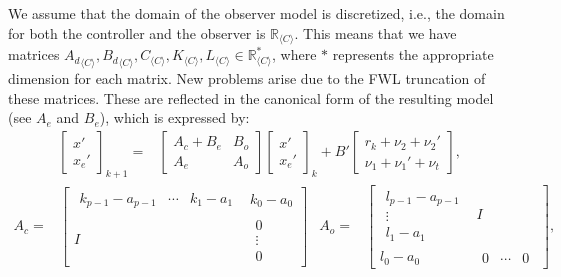 \documentclass[sigconf]{llncs}
\newcommand{\mat}[1]{{#1}}
\renewcommand{\vec}[1]{{#1}}
\begin{document}
We assume that the domain of the observer model is discretized, 
i.e., the domain for both the controller and the observer is $\mathbb{R}_{\langle C \rangle}$.
This means that we have matrices 
${\mat{A}_d}_{\langle C
\rangle},{\mat{B}_d}_{\langle C \rangle},\mat{C}_{\langle C \rangle},
\mat{K}_{\langle C \rangle}, \mat{L}_{\langle C \rangle} \in
\mathbb{R}_{\langle C \rangle}^*$, 
where $*$ represents the appropriate dimension for each matrix.
New problems arise due to the FWL truncation of these matrices. 
These are reflected in the canonical form of the resulting model (see $\mat{A}_e$ and $\mat{B}_e$),
which is expressed by:
%
{\setlength{\belowdisplayskip}{2pt}
\begin{align}
\left [\begin{array}{c}\vec{x}'\\ \vec{x}_e' \end{array}\right]_{k+1}
=& \left [\begin{array}{cc}\mat{A}_{c}+\mat{B}_{e}&\mat{B}_{o}\\ \mat{A}_{e}&\mat{A}_{o}\end{array}\right]
\left [\begin{array}{c}\vec{x}'\\ \vec{x}_e' \end{array}\right]_k
+\mat{B}'\left [\begin{array}{c} \vec{r}_k + \nu_2+\nu_2'\\ \nu_1+\nu_1'+\nu_t\end{array}\right], %
\label{eq:observer_LTI_FWL_cf}
\end{align}
}
{\setlength{\abovedisplayskip}{2pt}
\setlength{\belowdisplayskip}{2pt}
\begin{align*}
\mat{A}_c=&\left[\begin{array}{cc}
\begin{array}{ccc}k_{p-1}-a_{p-1}&\cdots&k_1-a_1\end{array}&k_0-a_0\\
\mat{I}&\begin{array}{c}0\\ \vdots \\ 0\end{array}
\end{array}\right]&
\mat{A}_o=&\left[\begin{array}{cc}
\begin{array}{c}l_{p-1}-a_{p-1}\\ \vdots\\ l_1-a_1\end{array}&\mat{I}\\
l_0-a_0&\begin{array}{ccc}0&\cdots&0\end{array}
\end{array}\right], 
\end{align*}}
\end{document}
